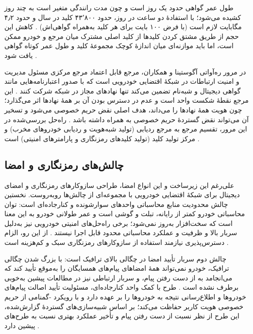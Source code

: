 طول عمر گواهی حدود یک روز است و چون مدت رانندگی متغیر است به چند روز کشیده می‌شود؛ با استفادهٔ دو ساعت در روز، حدود ۴۳٬۸۰۰ کلید در سال و حدود ۴٫۲ مگابایت لازم است (با فرض ۱۰۰ بایت برای هر کلید به‌همراه گواهی‌اش) \cite{SecuringVehicularAd}. کاهش این حجم از طریق مشتق کردن کلیدها از کلید اصلی مشترک میان مرجع و خودرو ممکن است، اما باید موازنه‌ای میان اندازهٔ کوچک مجموعهٔ کلید و طول عمر کوتاه گواهی یافت شود \cite{SecuringVehicularAd}.

در مرور ره‌آواتی آگوستینا و همکاران، مرجع قابل اعتماد مرجع مرکزی مسئول مدیریت و امنیت ارتباطات در شبکهٔ اقتضایی خودرویی است که با صدور اعتبارنامه‌هایی مانند گواهی دیجیتال و شبه‌نام تضمین می‌کند تنها نهادهای مجاز در شبکه شرکت کنند \cite{rahmawatiagustinaSystematicLiteratureReview2025}. این مرجع نقطهٔ شکست واحد است و عدم در دسترس بودن آن بر همهٔ نهادها اثر می‌گذارد؛ چون هویت همهٔ نهادها را می‌داند، هدف اصلی نقض حریم خصوصی می‌شود و تسخیر آن می‌تواند نقض گستردهٔ حریم خصوصی به همراه داشته باشد \cite{rahmawatiagustinaSystematicLiteratureReview2025}. راه‌حل بررسی‌شده در این مرور، تقسیم مرجع به مرجع ردیابی (تولید شبه‌هویت و ردیابی خودروهای مخرب) و مرکز تولید کلید (تولید کلیدهای رمزنگاری و پارامترهای امنیتی) است \cite{rahmawatiagustinaSystematicLiteratureReview2025}.

\subsection{چالش‌های رمزنگاری و امضا}

علی‌رغم این زیرساخت و این انواع امضا، طراحی سازوکارهای رمزنگاری و امضای دیجیتال برای شبکهٔ اقتضایی خودرویی با مجموعه‌ای از چالش‌ها روبه‌روست. نخستین چالش محدودیت منابع محاسباتی واحدهای سوارشونده و کنارجاده‌ای است: توان محاسباتی خودرو کمتر از رایانه، تبلت و گوشی است و عمر طولانی خودرو به این معنا است که سخت‌افزار به‌روز نمی‌شود؛ برخی راه‌حل‌های امنیتی خودرویی نیز به‌دلیل سربار بالا و ظرفیت و عملکرد محاسباتی محدود قابل اجرا نیستند \cite{farsimadanReviewSecurityChallenges2025}. از این رو، الزام دسترس‌پذیری نیازمند استفاده از سازوکارهای رمزنگاری سبک و کم‌هزینه است \cite{farsimadanReviewSecurityChallenges2025}.

چالش دوم سربار تأیید امضا در چگالی بالای ترافیک است: با بزرگ شدن چگالی ترافیک، خودرو نمی‌تواند همهٔ امضاهای پیام‌های همسایگان را به‌موقع تأیید کند که می‌انجامد به از دست رفتن پیام، و سربار ارتباطی نیز در مطالعات پیشین به‌خوبی برطرف نشده است \cite{zhangRAISEEfficientRSUAided2008}. طرح  با کمک واحد کنارجاده‌ای، مسئولیت تأیید اصالت پیام‌های خودروها و اطلاع‌رسانی نتیجه به خودروها را بر عهده دارد و با رویکرد -گمنامی از حریم خصوصی هویت کاربر حفاظت می‌کند؛ بر اساس شبیه‌سازی‌های گستردهٔ گزارش‌شده، این طرح از نظر نسبت از دست رفتن پیام و تأخیر عملکرد بهتری نسبت به طرح‌های پیشین دارد \cite{zhangRAISEEfficientRSUAided2008}.

